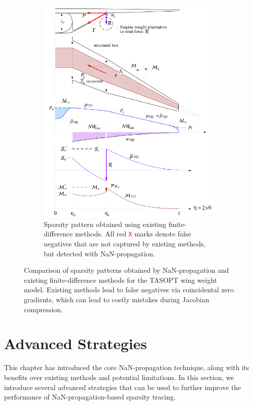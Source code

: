 \begin{figure}[H]
\begin{subfigure}{0.49\textwidth}
        \includegraphics[page=11, width=\textwidth]{../figures/nan-propagation/cropped.pdf}
        \caption{Sparsity pattern obtained using existing finite-difference methods. All red \textcolor{red}{\texttt{X}} marks denote false negatives that are not captured by existing methods, but detected with NaN-propagation.}
        \label{fig:nan-comparison-fd}
    \end{subfigure}
    \caption{Comparison of sparsity patterns obtained by NaN-propagation and existing finite-difference methods for the TASOPT wing weight model. Existing methods lead to false negatives via coincidental zero gradients, which can lead to costly mistakes during Jacobian compression.}
    \label{fig:nan-comparison}
\end{figure}


\section{Advanced Strategies}

This chapter has introduced the core NaN-propagation technique, along with its benefits over existing methods and potential limitations. In this section, we introduce several advanced strategies that can be used to further improve the performance of NaN-propagation-based sparsity tracing.

